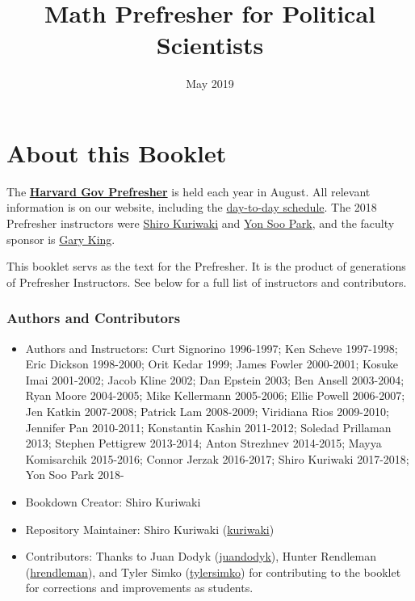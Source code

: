 \documentclass[]{book}
\title{Math Prefresher for Political Scientists}
\author{}
\date{May 2019}
\providecommand{\tightlist}{%
  \setlength{\itemsep}{0pt}\setlength{\parskip}{0pt}}
\theoremstyle{definition}
\theoremstyle{definition}
\theoremstyle{definition}
\theoremstyle{remark}
\begin{document}
\maketitle

{
\setcounter{tocdepth}{1}
\tableofcontents
}
\hypertarget{about-this-booklet}{%
\chapter*{About this Booklet}\label{about-this-booklet}}

The \href{https://projects.iq.harvard.edu/prefresher}{\textbf{Harvard Gov Prefresher}} is held each year in August. All relevant information is on our website, including the \href{https://projects.iq.harvard.edu/prefresher/schedule}{day-to-day schedule}. The 2018 Prefresher instructors were \href{https://www.shirokuriwaki.com}{Shiro Kuriwaki} and \href{https://scholar.harvard.edu/yonsoopark/home}{Yon Soo Park}, and the faculty sponsor is \href{https://gking.harvard.edu}{Gary King}.

This booklet servs as the text for the Prefresher. It is the product of generations of Prefresher Instructors. See below for a full list of instructors and contributors.

\hypertarget{authors-and-contributors}{%
\subsection*{Authors and Contributors}\label{authors-and-contributors}}

\begin{itemize}
\tightlist
\item
  Authors and Instructors: Curt Signorino 1996-1997; Ken Scheve 1997-1998; Eric Dickson 1998-2000; Orit Kedar 1999; James Fowler 2000-2001; Kosuke Imai 2001-2002; Jacob Kline 2002; Dan Epstein 2003; Ben Ansell 2003-2004; Ryan Moore 2004-2005; Mike Kellermann 2005-2006; Ellie Powell 2006-2007; Jen Katkin 2007-2008; Patrick Lam 2008-2009; Viridiana Rios 2009-2010; Jennifer Pan 2010-2011; Konstantin Kashin 2011-2012; Soledad Prillaman 2013; Stephen Pettigrew 2013-2014; Anton Strezhnev 2014-2015; Mayya Komisarchik 2015-2016; Connor Jerzak 2016-2017; Shiro Kuriwaki 2017-2018; Yon Soo Park 2018-
\item
  Bookdown Creator: Shiro Kuriwaki
\item
  Repository Maintainer: Shiro Kuriwaki (\href{https://github.com/kuriwaki}{kuriwaki})
\item
  Contributors: Thanks to Juan Dodyk (\href{https://github.com/juandodyk}{juandodyk}), Hunter Rendleman (\href{https://github.com/hrendleman}{hrendleman}), and Tyler Simko (\href{https://github.com/tylersimko}{tylersimko}) for contributing to the booklet for corrections and improvements as students.
\end{itemize}
\end{document}
